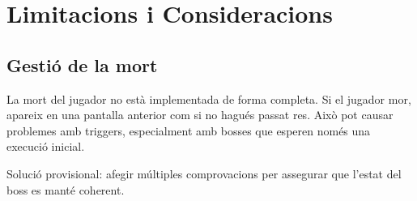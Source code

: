 \documentclass[a4paper,12pt]{article}
\begin{document}
\section{Limitacions i Consideracions}

\subsection{Gestió de la mort}
La mort del jugador no està implementada de forma completa. Si el jugador mor, apareix en una pantalla anterior com si no hagués passat res. Això pot causar problemes amb triggers, especialment amb bosses que esperen només una execució inicial.

Solució provisional: afegir múltiples comprovacions per assegurar que l'estat del boss es manté coherent.
\end{document}
